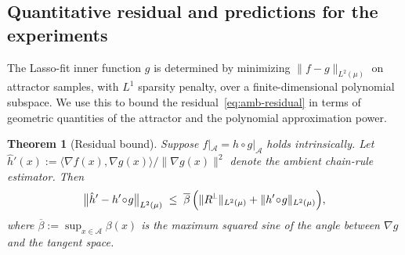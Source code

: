 \documentclass{article}
\newtheorem{example}{Example}
\newtheorem{theorem}{Theorem}
\begin{document}

\subsection{Quantitative residual and predictions for the experiments}

The Lasso-fit inner function $g$ is determined by minimizing
$\|f - g\|_{L^2(\mu)}$ on attractor samples, with $L^1$ sparsity
penalty, over a finite-dimensional polynomial subspace. We use this
to bound the residual~\eqref{eq:amb-residual} in terms of geometric
quantities of the attractor and the polynomial approximation power.

\begin{theorem}[Residual bound]
\label{thm:residual}
Suppose $f|_{\mathcal{A}} = h\circ g|_{\mathcal{A}}$ holds intrinsically.
Let $\hat h'(x) := \langle\nabla f(x),\nabla g(x)\rangle/\|\nabla g(x)\|^2$
denote the ambient chain-rule estimator. Then
\begin{equation}
  \bigl\|\hat h' - h'\!\circ\! g\bigr\|_{L^2(\mu)}
  \;\le\;
  \overline{\beta}\,\Bigl(
      \|R^{\!\perp}\|_{L^2(\mu)} + \|h'\!\circ\! g\|_{L^2(\mu)}
  \Bigr),
\end{equation}
where $\overline{\beta} := \sup_{x\in\mathcal{A}}\beta(x)$ is the maximum
squared sine of the angle between $\nabla g$ and the tangent space.
\end{theorem}
\end{document}
